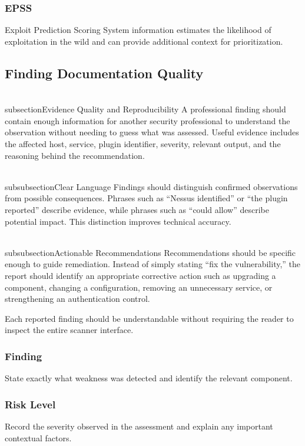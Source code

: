\documentclass[11pt,a4paper]{article}
\begin{document}
\subsubsection{EPSS}
Exploit Prediction Scoring System information estimates the likelihood of exploitation in the wild and can provide additional context for prioritization.

\subsection{Finding Documentation Quality}
\\subsection{Evidence Quality and Reproducibility}
A professional finding should contain enough information for another security professional to understand the observation without needing to guess what was assessed. Useful evidence includes the affected host, service, plugin identifier, severity, relevant output, and the reasoning behind the recommendation.

\\subsubsection{Clear Language}
Findings should distinguish confirmed observations from possible consequences. Phrases such as ``Nessus identified'' or ``the plugin reported'' describe evidence, while phrases such as ``could allow'' describe potential impact. This distinction improves technical accuracy.

\\subsubsection{Actionable Recommendations}
Recommendations should be specific enough to guide remediation. Instead of simply stating ``fix the vulnerability,'' the report should identify an appropriate corrective action such as upgrading a component, changing a configuration, removing an unnecessary service, or strengthening an authentication control.

Each reported finding should be understandable without requiring the reader to inspect the entire scanner interface.

\subsubsection{Finding}
State exactly what weakness was detected and identify the relevant component.

\subsubsection{Risk Level}
Record the severity observed in the assessment and explain any important contextual factors.
\end{document}
